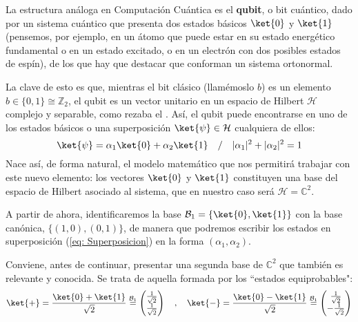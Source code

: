 \documentclass[11pt,a4paper,twoside,pdf]{article}
\numberwithin{equation}{section}
\begin{document}
		La estructura análoga en Computación Cuántica es el \textbf{qubit}, o bit cuántico, dado por un sistema cuántico que presenta dos estados básicos $\ket{0}$ y $\ket{1}$ (pensemos, por ejemplo, en un átomo que puede estar en su estado energético fundamental o en un estado excitado, o en un electrón con dos posibles estados de espín), de los que hay que destacar que conforman un sistema ortonormal.
				
		La clave de esto es que, mientras el bit clásico (llamémoslo $b$) es un elemento $b\in\{0,1\} \cong \mathbb{Z}_2$, el qubit es un vector unitario en un espacio de Hilbert $\mathcal{H}$ complejo y separable, como rezaba el . Así, el qubit puede encontrarse en uno de los estados básicos o una superposición $\ket{\psi} \in \mathcal{H}$ cualquiera de ellos:
			\begin{equation} \label{eq: Superposicion}
				\ket{\psi} = \alpha_1 \ket{0} + \alpha_2 \ket{1} \quad / \quad |\alpha_1|^2+|\alpha_2|^2=1					
			\end{equation}
		Nace así, de forma natural, el modelo matemático que nos permitirá trabajar con este nuevo elemento: los vectores $\ket{0}$ y $\ket{1}$ constituyen una base del espacio de Hilbert asociado al sistema, que en nuestro caso será $\mathcal{H} = \mathbb{C}^2$. 
				
		A partir de ahora, identificaremos la base $\mathcal{B}_1=\{\ket{0},\ket{1}\}$ con la base canónica, $ \{(1,0),(0,1)\} $, de manera que podremos escribir los estados en superposición (\ref{eq: Superposicion}) en la forma $ (\alpha_1,\alpha_2)$.
				
		Conviene, antes de continuar, presentar una segunda base de $\mathbb{C}^2$ que también es relevante y conocida. Se trata de aquella formada por los ``estados equiprobables":
			\begin{equation}\label{eq: Equiprobables}	
				\ket{+} = \frac{\ket{0}+\ket{1}}{\sqrt{2}} \overset{\mathcal{B}_1}{=} 
					\left( \begin{matrix} \frac{1}{\sqrt{2}} \\ \frac{1}{\sqrt{2}} \end{matrix} \right) \quad , \quad
				\ket{-}  = \frac{\ket{0}-\ket{1}}{\sqrt{2}} \overset{\mathcal{B}_1}{=} 
						\left( \begin{matrix} \frac{1}{\sqrt{2}} \\ -\frac{1}{\sqrt{2}} \end{matrix} \right)	
				\end{equation}
	
\end{document}
